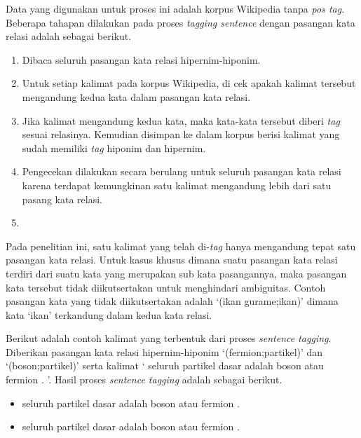 \noindent Data yang digunakan untuk proses ini adalah korpus Wikipedia tanpa \textit{pos tag}. Beberapa tahapan dilakukan pada proses \textit{tagging sentence} dengan pasangan kata relasi adalah sebagai berikut.

\begin{enumerate}
  \item Dibaca seluruh pasangan kata relasi hipernim-hiponim.
  \item Untuk setiap kalimat pada korpus Wikipedia, di cek apakah kalimat tersebut mengandung kedua kata dalam pasangan kata relasi.
  \item Jika kalimat mengandung kedua kata, maka kata-kata tersebut diberi \textit{tag} sesuai relasinya. Kemudian disimpan ke dalam korpus berisi kalimat yang sudah memiliki \textit{tag} hiponim dan hipernim.
  \item Pengecekan dilakukan secara berulang untuk seluruh pasangan kata relasi karena terdapat kemungkinan satu kalimat mengandung lebih dari satu pasang kata relasi.
  \item 
\end{enumerate}

Pada penelitian ini, satu kalimat yang telah di-\textit{tag} hanya mengandung tepat satu pasangan kata relasi. Untuk kasus khusus dimana suatu pasangan kata relasi terdiri dari suatu kata yang merupakan sub kata pasangannya, maka pasangan kata tersebut tidak diikutsertakan untuk menghindari ambiguitas. Contoh pasangan kata yang tidak diikutsertakan adalah `(ikan\,\,gurame;ikan)' dimana kata `ikan' terkandung dalam kedua kata relasi.

Berikut adalah contoh kalimat yang terbentuk dari proses \textit{sentence tagging}. Diberikan pasangan kata relasi hipernim-hiponim `(fermion;partikel)' dan `(boson;partikel)' serta kalimat  `{\tagStart} seluruh partikel dasar adalah boson atau fermion . {\tagEnd}'. Hasil proses \textit{sentence tagging} adalah sebagai berikut.
\begin{itemize}
  \item {\tagStart} seluruh {\tagHypernym}partikel{\tagHypernym} dasar adalah boson atau {\tagHyponym}fermion{\tagHyponym} . {\tagEnd}
  \item {\tagStart} seluruh {\tagHypernym}partikel{\tagHypernym} dasar adalah {\tagHyponym}boson{\tagHyponym} atau fermion . {\tagEnd}
\end{itemize}
%
%

